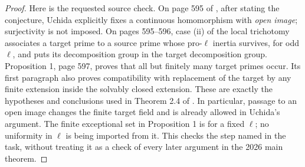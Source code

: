 \begin{proof}
Here is the requested source check. On page 595 of
\cite{A_Uchida1981}, after stating the conjecture, Uchida
explicitly fixes a continuous homomorphism with \emph{open
image}; surjectivity is not imposed. On pages 595--596,
case (ii) of the local trichotomy associates a target prime
to a source prime whose pro-$\ell$ inertia survives, for
odd $\ell$, and puts its decomposition group in the target
decomposition group. Proposition 1, page 597, proves that
all but finitely many target primes occur. Its first paragraph
also proves compatibility with replacement of the target by
any finite extension inside the solvably closed extension.
These are exactly the hypotheses and conclusions used in
Theorem 2.4 of \cite{A_OpenAI2026Hom}. In particular, passage
to an open image changes the finite target field and is
already allowed in Uchida's argument. The finite exceptional
set in Proposition 1 is for a fixed $\ell$; no uniformity in
$\ell$ is being imported from it. This checks the step named
in the task, without treating it as a check of every later
argument in the 2026 main theorem.
\end{proof}

